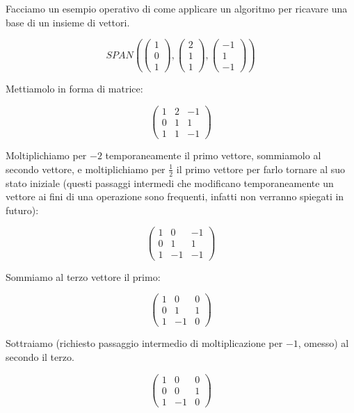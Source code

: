 \documentclass{article}
\begin{document}
Facciamo un esempio operativo di come applicare un algoritmo per ricavare una base di un insieme di vettori.

\[SPAN(\begin{pmatrix}
    1 \\
    0 \\
    1
\end{pmatrix}, \begin{pmatrix}
    2 \\
    1 \\
    1
\end{pmatrix}, \begin{pmatrix}
    -1 \\
    1 \\
    -1
\end{pmatrix})\]

Mettiamolo in forma di matrice:

\[\begin{pmatrix}
1 & 2 & -1 \\
0 & 1 & 1 \\
1 & 1 & -1
\end{pmatrix}\]

Moltiplichiamo per $-2$ temporaneamente il primo vettore, sommiamolo al secondo vettore, e moltiplichiamo per $\frac{1}{2}$ il primo vettore per farlo tornare al suo stato iniziale (questi passaggi intermedi che modificano temporaneamente un vettore ai fini di una operazione sono frequenti, infatti non verranno spiegati in futuro):

\[\begin{pmatrix}
1 & 0 & -1 \\
0 & 1 & 1 \\
1 & -1 & -1
\end{pmatrix}\]

Sommiamo al terzo vettore il primo:

\[\begin{pmatrix}
1 & 0 & 0 \\
0 & 1 & 1 \\
1 & -1 & 0
\end{pmatrix}\]

Sottraiamo (richiesto passaggio intermedio di moltiplicazione per $-1$, omesso) al secondo il terzo.

\[\begin{pmatrix}
1 & 0 & 0 \\
0 & 0 & 1 \\
1 & -1 & 0
\end{pmatrix}\]
\end{document}
